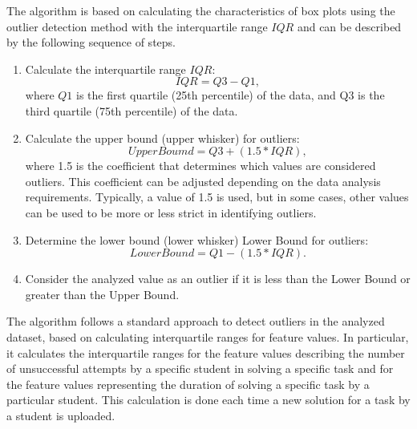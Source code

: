 \documentclass[letterpaper]{article}
\begin{document}
\begin{multicols}{2}
\begin{justify}
      The algorithm is based on calculating the characteristics of box plots using the outlier detection method with the interquartile range $IQR$ and can be described by the following sequence of steps.

      \begin{enumerate}
        \item Calculate the interquartile range $IQR$:
        $$IQR = Q3 - Q1,$$
        where $Q1$ is the first quartile (25th percentile) of the data, and Q3 is the third quartile (75th percentile) of the data.
        \item Calculate the upper bound (upper whisker) for outliers:
        $$Upper Boumd = Q3 + (1.5 * IQR),$$
        where 1.5 is the coefficient that determines which values are considered outliers. This coefficient can be adjusted depending on the data analysis requirements. Typically, a value of 1.5 is used, but in some cases, other values can be used to be more or less strict in identifying outliers.
        \item Determine the lower bound (lower whisker) Lower Bound for outliers:
        $$Lower Bound=Q1-(1.5*IQR).$$
        \item Consider the analyzed value as an outlier if it is less than the Lower Bound or greater than the Upper Bound.
      \end{enumerate}
      The algorithm follows a standard approach to detect outliers in the analyzed dataset, based on calculating interquartile ranges for feature values. In particular, it calculates the interquartile ranges for the feature values describing the number of unsuccessful attempts by a specific student in solving a specific task and for the feature values representing the duration of solving a specific task by a particular student. This calculation is done each time a new solution for a task by a student is uploaded.


\end{justify}
\end{multicols}
\end{document}
